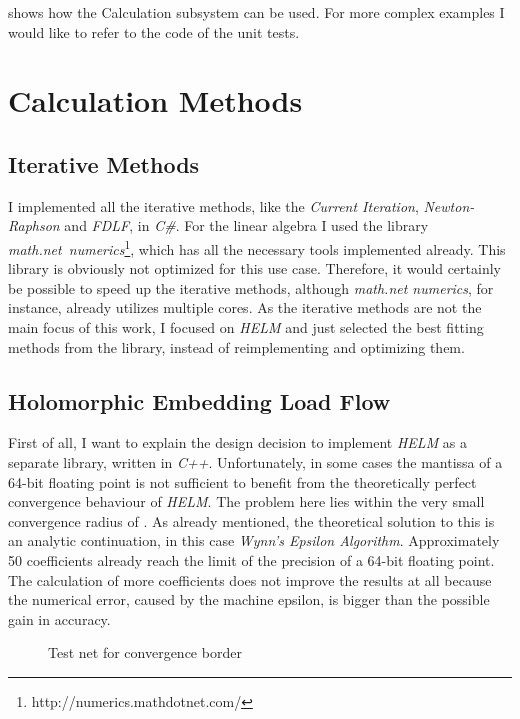  shows how the Calculation subsystem can be used. For more complex examples I would like to refer to the code of the unit tests.

\section{Calculation Methods}
\label{sec:implementation_calculation_methods}

\subsection{Iterative Methods}
I implemented all the iterative methods, like the \emph{Current Iteration}, \emph{Newton-Raphson} and \emph{FDLF}, in \emph{C\#}. For the linear algebra I used the library \mbox{\emph{math.net numerics}\footnote{http://numerics.mathdotnet.com/}}, which has all the necessary tools implemented already. This library is obviously not optimized for this use case. Therefore, it would certainly be possible to speed up the iterative methods, although \emph{math.net numerics}, for instance, already utilizes multiple cores. As the iterative methods are not the main focus of this work, I focused on \emph{HELM} and just selected the best fitting methods from the library, instead of reimplementing and optimizing them.

\subsection{Holomorphic Embedding Load Flow}
\label{sec:implementation_helm}
First of all, I want to explain the design decision to implement \emph{HELM} as a separate library, written in \emph{C++}. Unfortunately, in some cases the mantissa of a 64-bit floating point is not sufficient to benefit from the theoretically perfect convergence behaviour of \emph{HELM}. The problem here lies within the very small convergence radius of . As already mentioned, the theoretical solution to this is an analytic continuation, in this case \emph{Wynn's Epsilon Algorithm}. Approximately 50 coefficients already reach the limit of the precision of a 64-bit floating point. The calculation of more coefficients does not improve the results at all because the numerical error, caused by the machine epsilon, is bigger than the possible gain in accuracy.

\begin{figure}
	\centering
	
	\caption{Test net for convergence border}
	\label{fig:convergence_border_net}
\end{figure}

